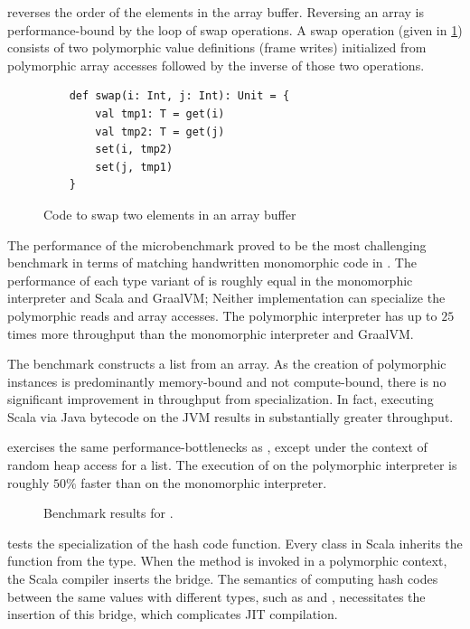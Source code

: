  reverses the order of the elements in the array buffer.
Reversing an array is performance-bound by the loop of swap operations.
A swap operation (given in \ref{impl:swap}) consists of two polymorphic value definitions (frame writes) initialized from polymorphic array accesses followed by the inverse of those two operations.

\begin{figure}[!htb]
\begin{verbatim}
	def swap(i: Int, j: Int): Unit = {
		val tmp1: T = get(i)
		val tmp2: T = get(j)
		set(i, tmp2)
		set(j, tmp1)
	}
\end{verbatim}
\caption{Code to swap two elements in an array buffer}
\label{impl:swap}
\end{figure}

The performance of the  microbenchmark proved to be the most challenging benchmark in terms of matching handwritten monomorphic code in \cite{scala:miniboxing}.
The performance of each type variant of  is roughly equal in the monomorphic interpreter and Scala and GraalVM; 
Neither implementation can specialize the polymorphic reads and array accesses.
The polymorphic interpreter has up to $25$ times more throughput than the monomorphic interpreter and GraalVM.

The  benchmark constructs a list from an array.
As the creation of polymorphic instances is predominantly memory-bound and not compute-bound, there is no significant improvement in throughput from specialization.
In fact, executing Scala via Java bytecode on the JVM results in substantially greater throughput.

 exercises the same performance-bottlenecks as , except under the context of random heap access for a list.
The execution of  on the polymorphic interpreter is roughly $50\%$ faster than on the monomorphic interpreter.

\begin{figure}[!htb]
	\centering
	
	\caption{Benchmark results for .}
\end{figure}

 tests the specialization of the hash code function.
Every class in Scala inherits the  function from the  type.
When the  method is invoked in a polymorphic context, the Scala compiler inserts the  bridge.
The semantics of computing hash codes between the same values with different types, such as  and , necessitates the insertion of this bridge, which complicates JIT compilation.

